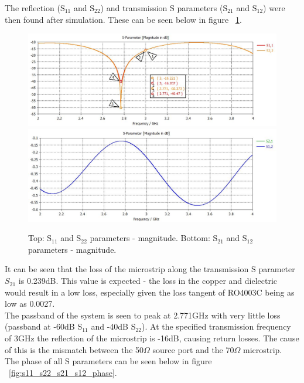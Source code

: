\documentclass{paper}
\begin{document}
The reflection (S$_{11}$ and S$_{22}$) and transmission S parameters (S$_{21}$ and S$_{12}$) were then found after simulation. These can be seen below in figure ~\ref{fig:s11_s22_s21_s12}.

\begin{figure}[H]
	\centering
	\includegraphics[scale=0.4]{IMG/S11_and_S22}
	\includegraphics[scale=0.4]{IMG/S21_and_S12}
	\caption{Top: S$_{11}$ and S$_{22}$ parameters - magnitude. Bottom: S$_{21}$ and S$_{12}$ parameters - magnitude.}
	\label{fig:s11_s22_s21_s12}
\end{figure}

It can be seen that the loss of the microstrip along the transmission S parameter $S_{21}$ is 0.239dB. This value is expected - the loss in the copper and dielectric would result in a low loss, especially given the loss tangent of RO4003C being as low as 0.0027.\\

The passband of the system is seen to peak at 2.771GHz with very little loss (passband at -60dB S$_{11}$ and -40dB S$_{22}$). At the specified transmission frequency of 3GHz the reflection of the microstrip is -16dB, causing return losses. The cause of this is the mismatch between the 50$\Omega$ source port and the 70$\Omega$ microstrip.\\

The phase of all S parameters can be seen below in figure ~\ref{fig:s11_s22_s21_s12_phase}.\\
\end{document}
